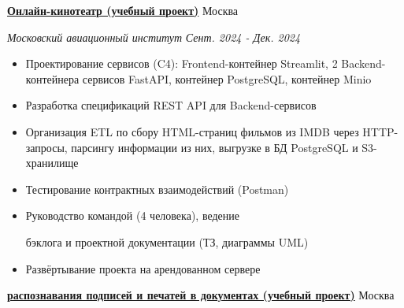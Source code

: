 \documentclass[14pt, a4paper, oneside]{extarticle}
\begin{document}

\begin{flushleft}
	\vspace{-\intextsep}
	\quad
	\href{https://github.com/Crazy5202/Python_project}{\textbf{Онлайн-кинотеатр (учебный проект)}}
	\hfill
	Москва
\end{flushleft}

\begin{flushleft}
	\vspace{-1\intextsep}
	\quad
	\textit{Московский авиационный институт}
	\hfill
	\textit{\small Сент. 2024 - Дек. 2024}
\end{flushleft}


\begin{itemize}
	\vspace{-2\intextsep}
	\item Проектирование сервисов (C4): Frontend-контейнер Streamlit, 2 Backend-контейнера сервисов FastAPI, контейнер PostgreSQL, контейнер Minio
	\vspace{-0.8\intextsep}
	\item Разработка спецификаций REST API для Backend-сервисов
	\vspace{-0.8\intextsep}
	\item Организация ETL по сбору HTML-страниц фильмов из IMDB через HTTP-запросы,
    парсингу информации из них, выгрузке в БД PostgreSQL и S3-хранилище
	\vspace{-2\intextsep}
    \item Тестирование контрактных взаимодействий (Postman)
	\vspace{-0.8\intextsep}
    \item Руководство командой (4 человека), ведение 

    \vspace{-0.5\intextsep}
    бэклога и проектной документации (ТЗ, диаграммы UML)
    \vspace{-0.8\intextsep}
    \item Развёртывание проекта на арендованном сервере
\end{itemize}


\begin{flushleft}
	\vspace{-0.8\intextsep}
	\quad
	\href{https://github.com/Crazy5202/CM_2024}{\textbf{ распознавания подписей и печатей в документах (учебный проект)}}
	\hfill
	Москва
\end{flushleft}
\end{document}
